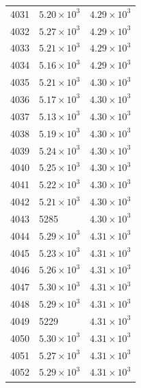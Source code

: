 \begin{table}[H]
\begin{tabular}{lll}
4031 & $\displaystyle 5.20 \times 10^{3}$ & $\displaystyle 4.29 \times 10^{3}$ \\
4032 & $\displaystyle 5.27 \times 10^{3}$ & $\displaystyle 4.29 \times 10^{3}$ \\
4033 & $\displaystyle 5.21 \times 10^{3}$ & $\displaystyle 4.29 \times 10^{3}$ \\
4034 & $\displaystyle 5.16 \times 10^{3}$ & $\displaystyle 4.29 \times 10^{3}$ \\
4035 & $\displaystyle 5.21 \times 10^{3}$ & $\displaystyle 4.30 \times 10^{3}$ \\
4036 & $\displaystyle 5.17 \times 10^{3}$ & $\displaystyle 4.30 \times 10^{3}$ \\
4037 & $\displaystyle 5.13 \times 10^{3}$ & $\displaystyle 4.30 \times 10^{3}$ \\
4038 & $\displaystyle 5.19 \times 10^{3}$ & $\displaystyle 4.30 \times 10^{3}$ \\
4039 & $\displaystyle 5.24 \times 10^{3}$ & $\displaystyle 4.30 \times 10^{3}$ \\
4040 & $\displaystyle 5.25 \times 10^{3}$ & $\displaystyle 4.30 \times 10^{3}$ \\
4041 & $\displaystyle 5.22 \times 10^{3}$ & $\displaystyle 4.30 \times 10^{3}$ \\
4042 & $\displaystyle 5.21 \times 10^{3}$ & $\displaystyle 4.30 \times 10^{3}$ \\
4043 & 5285 & $\displaystyle 4.30 \times 10^{3}$ \\
4044 & $\displaystyle 5.29 \times 10^{3}$ & $\displaystyle 4.31 \times 10^{3}$ \\
4045 & $\displaystyle 5.23 \times 10^{3}$ & $\displaystyle 4.31 \times 10^{3}$ \\
4046 & $\displaystyle 5.26 \times 10^{3}$ & $\displaystyle 4.31 \times 10^{3}$ \\
4047 & $\displaystyle 5.30 \times 10^{3}$ & $\displaystyle 4.31 \times 10^{3}$ \\
4048 & $\displaystyle 5.29 \times 10^{3}$ & $\displaystyle 4.31 \times 10^{3}$ \\
4049 & 5229 & $\displaystyle 4.31 \times 10^{3}$ \\
4050 & $\displaystyle 5.30 \times 10^{3}$ & $\displaystyle 4.31 \times 10^{3}$ \\
4051 & $\displaystyle 5.27 \times 10^{3}$ & $\displaystyle 4.31 \times 10^{3}$ \\
4052 & $\displaystyle 5.29 \times 10^{3}$ & $\displaystyle 4.31 \times 10^{3}$ \\

\end{tabular}
\end{table}
